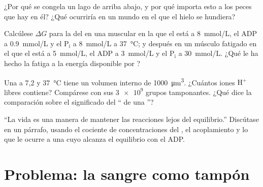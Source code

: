 \begin{exercise}[$\star\star$]\label{exo:b1:water-small-molecules:9}
¿Por qué se congela un lago de arriba abajo, y por qué importa esto a los
peces que hay en él? ¿Qué ocurriría en un mundo en el que el hielo se
hundiera?
\end{exercise}

\begin{exercise}[$\star\star\star$]\label{exo:b1:water-small-molecules:10}
Calcúlese $\Delta G$ para la  del  en una  muscular en la
que el  está a \qty{8}{mmol/L}, el ADP a \qty{0.9}{mmol/L} y el
$\mathrm{P_i}$ a \qty{8}{mmol/L} a \qty{37}{\celsius}; y después en un
músculo fatigado en el que el  está a \qty{5}{mmol/L}, el ADP a
\qty{3}{mmol/L} y el $\mathrm{P_i}$ a \qty{30}{mmol/L}. ¿Qué le ha hecho la
fatiga a la energía disponible por ?
\end{exercise}

\begin{exercise}[$\star\star\star$]\label{exo:b1:water-small-molecules:11}
Una  a  7,2 y \qty{37}{\celsius} tiene un volumen interno de
\qty{1000}{\micro m^3}. ¿Cuántos iones $\mathrm{H^+}$ libres contiene?
Compárese con sus $\num{3e9}$ grupos tamponantes. ¿Qué dice la comparación
sobre el significado del `` de una ''?
\end{exercise}

\begin{exercise}[$\star\star\star$]\label{exo:b1:water-small-molecules:12}
``La vida es una manera de mantener las reacciones lejos del equilibrio.''
Discútase en un párrafo, usando el cociente de concentraciones del , el
acoplamiento y lo que le ocurre a una  cuyo  alcanza el equilibrio
con el ADP.
\end{exercise}

\section{Problema: la sangre como tampón}

